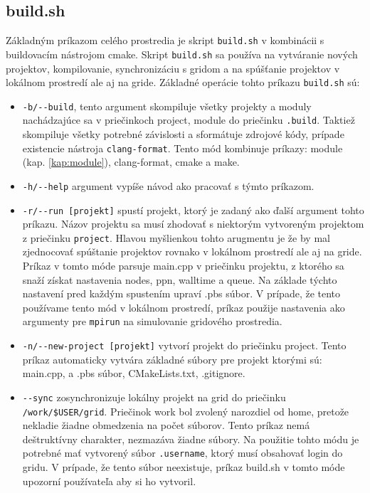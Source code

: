 \subsection{build.sh}
Základným príkazom celého prostredia je skript \texttt{build.sh} v kombinácii s buildovacím nástrojom cmake.
Skript \texttt{build.sh} sa používa na vytváranie nových projektov, kompilovanie,
synchronizáciu s gridom a na spúšťanie projektov v lokálnom prostredí ale aj na gride.
Základné operácie tohto príkazu \texttt{build.sh} sú:
\begin{itemize}
\item
  \texttt{-b/-{}-build}, tento argument skompiluje všetky projekty a moduly nachádzajúce sa v priečinkoch project, module do priečinku \texttt{.build}.
  Taktiež skompiluje všetky potrebné závislosti a sformátuje zdrojové kódy, prípade existencie nástroja \texttt{clang-format}.
  Tento mód kombinuje príkazy: module (kap. \ref{kap:module}), clang-format, cmake a make.
\item
  \texttt{-h/-{}-help} argument vypíše návod ako pracovať s týmto príkazom.
\item
  \texttt{-r/-{}-run [projekt]} spustí projekt, ktorý je zadaný ako ďalší argument tohto príkazu.
  Názov projektu sa musí zhodovať s niektorým vytvoreným projektom z priečinku \texttt{project}.
  Hlavou myšlienkou tohto arugmentu je že by mal zjednocovať spúštanie projektov rovnako v lokálnom prostredí ale aj na gride.
  Príkaz v tomto móde parsuje main.cpp v priečinku projektu, z ktorého sa snaží získat nastavenia nodes, ppn, walltime a queue.
  Na základe týchto nastavení pred každým spustením upraví .pbs súbor.
  V prípade, že tento používame tento mód v lokálnom prostredí,
  príkaz použije nastavenia ako argumenty pre \texttt{mpirun} na simulovanie gridového prostredia.
\item
  \texttt{-n/-{}-new-project [projekt]} vytvorí projekt do priečinku project.
  Tento príkaz automaticky vytvára základné súbory pre projekt ktorými sú: main.cpp, a .pbs súbor, CMakeLists.txt, .gitignore.
\item
  \texttt{-{}-sync} zosynchronizuje lokálny projekt na grid do priečinku \texttt{/work/\$USER/grid}.
  Priečinok work bol zvolený narozdiel od home, pretože nekladie žiadne obmedzenia na počet súborov.
  Tento príkaz nemá deštruktívny charakter, nezmazáva žiadne súbory.
  Na použitie tohto módu je potrebné mať vytvorený súbor \texttt{.username}, ktorý musí obsahovať login do gridu.
  V prípade, že tento súbor neexistuje, príkaz build.sh v tomto móde upozorní používateľa aby si ho vytvoril.  
\end{itemize}

